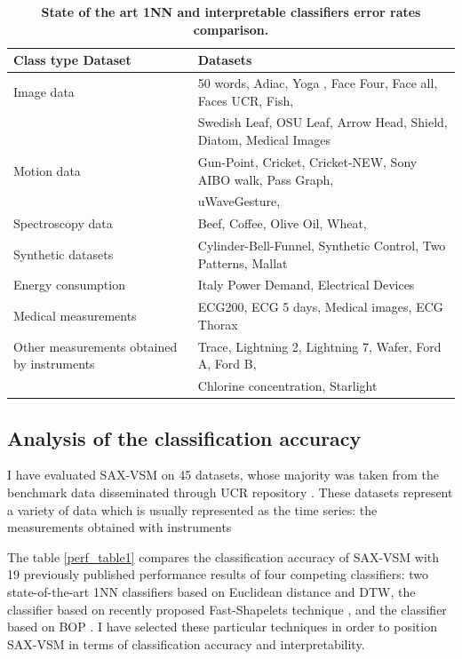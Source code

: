 \begin{table}[t!]
\caption{\bf State of the art 1NN and interpretable classifiers error rates comparison.}
\vspace{0.4cm}
 \label{data_typetable1}
\centering
{\setlength{\extrarowheight}{2pt}%
{\footnotesize
\begin{tabularx}{\linewidth}{@{} l l @{}}
\hline
Class type Dataset & Datasets \\[0.5ex]
\hline
Image data & 50 words, Adiac, Yoga , Face Four, Face all, Faces UCR, Fish, \\
 & Swedish Leaf, OSU Leaf, Arrow Head, Shield, Diatom, Medical Images \\[0.5ex]
Motion data & Gun-Point, Cricket, Cricket-NEW, Sony AIBO walk, Pass Graph, \\ 
 & uWaveGesture, \\[0.5ex]
Spectroscopy data & Beef, Coffee, Olive Oil, Wheat, \\[0.5ex]
Synthetic datasets & Cylinder-Bell-Funnel, Synthetic Control, Two Patterns, Mallat \\[0.5ex]
Energy consumption & Italy Power Demand, Electrical Devices \\[0.5ex]
Medical measurements & ECG200, ECG 5 days, Medical images, ECG Thorax \\[0.5ex]
Other measurements obtained by instruments & Trace, Lightning 2, Lightning 7, Wafer, Ford A, Ford B, \\
 & Chlorine concentration, Starlight \\[0.5ex]
\hline
\end{tabularx}
}}
\end{table}

\subsection{Analysis of the classification accuracy}
I have evaluated SAX-VSM on 45 datasets, whose majority was taken from the benchmark 
data disseminated through UCR repository \cite{ucr}. These datasets represent a variety 
of data which is usually represented as the time series: the measurements obtained with instruments

The table \ref{perf_table1} compares the classification accuracy of SAX-VSM with 
19 previously published performance results of four competing classifiers: two state-of-the-art 
1NN classifiers based on Euclidean distance and DTW, 
the classifier based on recently proposed Fast-Shapelets technique \cite{fast-shapelets}, 
and the classifier based on BOP \cite{bag_patterns}.
I have selected these particular techniques in order to position SAX-VSM in terms of 
classification accuracy and interpretability. 

